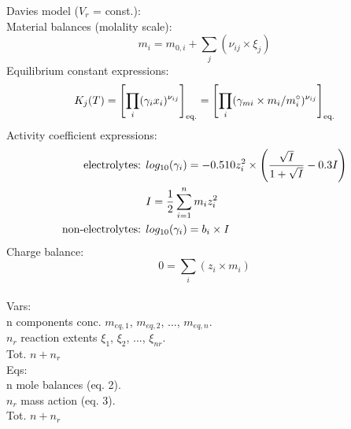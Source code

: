 \documentclass[12pt,a4paper,preview]{standalone}
\begin{document}
Davies model ($V_r$ = const.):\\
Material balances (molality scale):
\begin{equation}
m_i = m_{0,i} + \sum_j(\nu_{ij} \times \xi_j)
\end{equation}
Equilibrium constant expressions:
\begin{equation}
K_j(T) = \left[ \prod_i(\gamma_i x_i)^{\nu_{ij}} \right]_{\textnormal{eq.}} = 
\left[ \prod_i(\gamma_{mi} \times m_i/m^{\circ}_i )^{\nu_{ij}} \right]_{\textnormal{eq.}}
\end{equation}
Activity coefficient expressions:
\begin{equation}
\begin{aligned}
\textnormal{electrolytes: } & log_{10}(\gamma_{i}) = -0.510 z_i^2 \times \left( \frac{\sqrt{I}}{1+\sqrt{I}} -0.3 I \right) \\
& I = \frac{1}{2} \sum_{i=1}^n m_i z_i^2 \\
\textnormal{non-electrolytes: } & log_{10}(\gamma_{i}) = b_i \times I
\end{aligned}
\end{equation}
Charge balance:
\begin{equation}
0 = \sum_i(z_i \times m_i)
\end{equation}
\\
Vars: \\
n components conc. $m_{eq,1}$, $m_{eq,2}$, ..., $m_{eq,n}$. \\
$n_r$ reaction extents $\xi_1$, $\xi_2$, ..., $\xi_{nr}$. \\
Tot. $n + n_r$ \\
Eqs: \\
n mole balances (eq. 2). \\
$n_r$ mass action (eq. 3). \\
Tot. $n + n_r$
\end{document}
